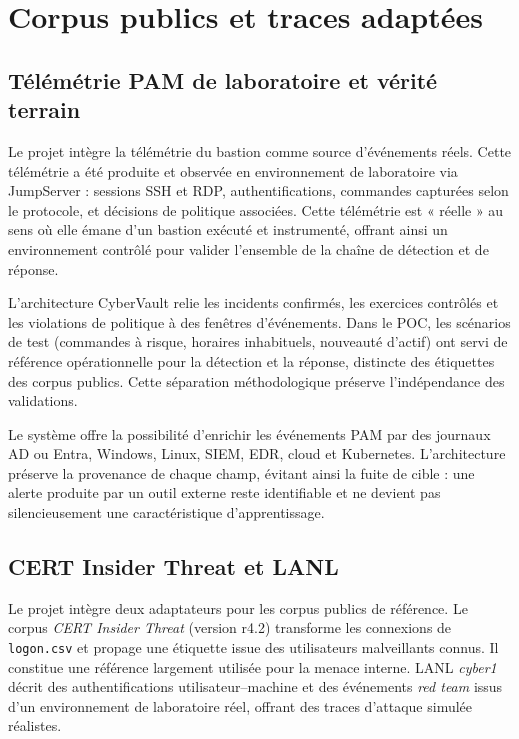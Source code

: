 \documentclass[11pt,a4paper,oneside]{report}
\theoremstyle{definition}
\theoremstyle{plain}
\begin{document}
\section{Corpus publics et traces adaptées}
\label{sec:data-sources}

\subsection{Télémétrie PAM de laboratoire et vérité terrain}

Le projet intègre la télémétrie du bastion comme source d'événements réels.
Cette télémétrie a été produite et observée en environnement de laboratoire
via JumpServer : sessions SSH et RDP, authentifications, commandes capturées
selon le protocole, et décisions de politique associées. Cette télémétrie est
« réelle » au sens où elle émane d'un bastion exécuté et instrumenté, offrant
ainsi un environnement contrôlé pour valider l'ensemble de la chaîne de
détection et de réponse.

L'architecture CyberVault relie les incidents confirmés, les exercices
contrôlés et les violations de politique à des fenêtres d'événements. Dans le
POC, les scénarios de test (commandes à risque, horaires inhabituels,
nouveauté d'actif) ont servi de référence opérationnelle pour la détection et
la réponse, distincte des étiquettes des corpus publics. Cette séparation
méthodologique préserve l'indépendance des validations.

Le système offre la possibilité d'enrichir les événements PAM par des journaux
AD ou Entra, Windows, Linux, SIEM, EDR, cloud et Kubernetes. L'architecture
préserve la provenance de chaque champ, évitant ainsi la fuite de cible :
une alerte produite par un outil externe reste identifiable et ne devient pas
silencieusement une caractéristique d'apprentissage.

\subsection{CERT Insider Threat et LANL}
\label{sec:data-cert-lanl}

Le projet intègre deux adaptateurs pour les corpus publics de référence. Le
corpus \emph{CERT Insider Threat} (version r4.2) transforme les connexions de
\texttt{logon.csv} et propage une étiquette issue des utilisateurs
malveillants connus. Il constitue une référence largement utilisée pour la
menace interne. LANL \emph{cyber1} décrit des authentifications
utilisateur--machine et des événements \emph{red team} issus d'un environnement
de laboratoire réel, offrant des traces d'attaque simulée réalistes.
\end{document}
